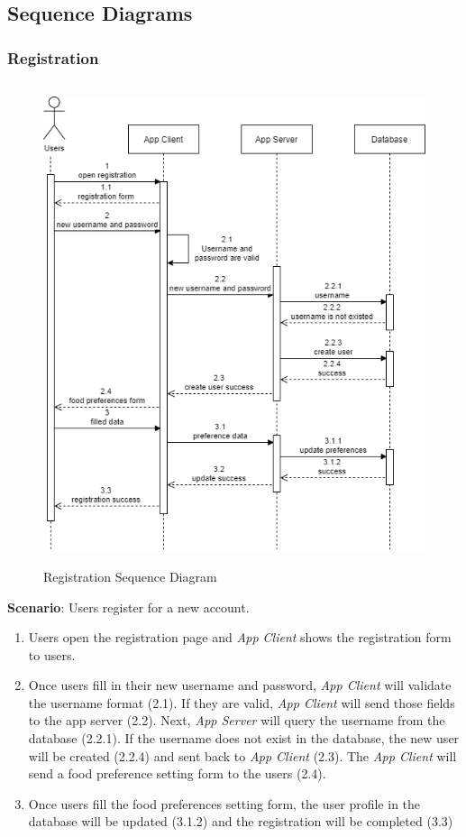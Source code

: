 \documentclass[12pt,oneside,openright,a4paper]{cpe-english-project}
\begin{document}
\newpage
\subsection{Sequence Diagrams}

\subsubsection{Registration}

\begin{figure}[H]\centering
\includegraphics[height=400pt]{./images/3seqdiagram_register.png}
\caption{Registration Sequence Diagram}\label{fig:3seqdiagram_register}
\end{figure}\vspace{-24pt}

\textbf{Scenario}: Users register for a new account.
\begin{enumerate}
\item Users open the registration page and \textit{App Client} shows the registration form to users.
\item Once users fill in their new username and password, \textit{App Client} will validate the username format (2.1). If they are valid, \textit{App Client} will send those fields to the app server (2.2). Next, \textit{App Server} will query the username from the database (2.2.1). If the username does not exist in the database, the new user will be created (2.2.4) and sent back to \textit{App Client} (2.3). The \textit{App Client} will send a food preference setting form to the users (2.4).
\item Once users fill the food preferences setting form, the user profile in the database will be updated (3.1.2) and the registration will be completed (3.3)
\end{enumerate}
\end{document}
